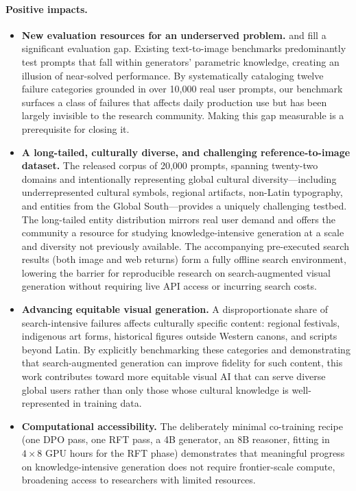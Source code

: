 \paragraph{Positive impacts.}
\begin{itemize}
  \item \textbf{New evaluation resources for an underserved problem.}
  \dataset{} and \bench{} fill a significant evaluation gap.
  Existing text-to-image benchmarks predominantly test prompts that fall within generators' parametric knowledge, creating an illusion of near-solved performance.
  By systematically cataloging twelve failure categories grounded in over 10{,}000 real user prompts, our benchmark surfaces a class of failures that affects daily production use but has been largely invisible to the research community.
  Making this gap measurable is a prerequisite for closing it.

  \item \textbf{A long-tailed, culturally diverse, and challenging reference-to-image dataset.}
  The released corpus of 20{,}000 prompts, spanning twenty-two domains and intentionally representing global cultural diversity---including underrepresented cultural symbols, regional artifacts, non-Latin typography, and entities from the Global South---provides a uniquely challenging testbed.
  The long-tailed entity distribution mirrors real user demand and offers the community a resource for studying knowledge-intensive generation at a scale and diversity not previously available.
  The accompanying pre-executed search results (both image and web returns) form a fully offline search environment, lowering the barrier for reproducible research on search-augmented visual generation without requiring live API access or incurring search costs.

  \item \textbf{Advancing equitable visual generation.}
  A disproportionate share of search-intensive failures affects culturally specific content: regional festivals, indigenous art forms, historical figures outside Western canons, and scripts beyond Latin.
  By explicitly benchmarking these categories and demonstrating that search-augmented generation can improve fidelity for such content, this work contributes toward more equitable visual AI that can serve diverse global users rather than only those whose cultural knowledge is well-represented in training data.

  \item \textbf{Computational accessibility.}
  The deliberately minimal co-training recipe (one DPO pass, one RFT pass, a 4B generator, an 8B reasoner, fitting in $4\times 8$ GPU hours for the RFT phase) demonstrates that meaningful progress on knowledge-intensive generation does not require frontier-scale compute, broadening access to researchers with limited resources.
\end{itemize}

